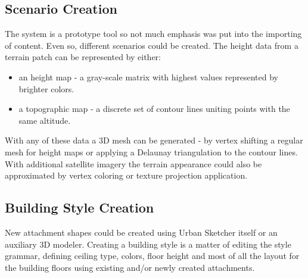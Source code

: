 \subsection{Scenario Creation}

The system is a prototype tool so not much emphasis was put into the importing of content.
Even so, different scenarios could be created.
The height data from a terrain patch can be represented by either:
\begin{itemize}
	\item an height map - a gray-scale matrix with highest values represented by brighter colors.
	\item a topographic map - a discrete set of contour lines uniting points with the same altitude.
\end{itemize}

With any of these data a 3D mesh can be generated - by vertex shifting a regular mesh for height maps or applying
a Delaunay triangulation to the contour lines.
With additional satellite imagery the terrain appearance could also be approximated by vertex coloring or texture projection application.


\subsection{Building Style Creation}

New attachment shapes could be created using Urban Sketcher itself or an auxiliary 3D modeler.
Creating a building style is a matter of editing the style grammar, defining ceiling type, colors, floor height and most of all
the layout for the building floors using existing and/or newly created attachments.




